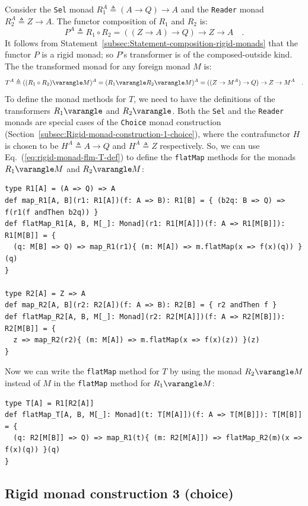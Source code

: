 Consider the \lstinline!Sel! monad $R_{1}^{A}\triangleq\left(A\rightarrow Q\right)\rightarrow A$
and the \lstinline!Reader! monad $R_{2}^{A}\triangleq Z\rightarrow A$.
The functor composition of $R_{1}$ and $R_{2}$ is:
\[
P^{A}\triangleq R_{1}\circ R_{2}=((Z\rightarrow A)\rightarrow Q)\rightarrow Z\rightarrow A\quad.
\]
It follows from Statement~\ref{subsec:Statement-composition-rigid-monads}
that the functor $P$ is a rigid monad; so $P$\textsf{'}s transformer is of
the composed-outside kind. The the transformed monad for any foreign
monad $M$ is:
\[
T^{A}\triangleq((R_{1}\circ R_{2})\varangle M)^{A}=(R_{1}\varangle R_{2}\varangle M)^{A}=((Z\rightarrow M^{A})\rightarrow Q)\rightarrow Z\rightarrow M^{A}\quad.
\]
To define the monad methods for $T$, we need to have the definitions
of the transformers $R_{1}\varangle$ and $R_{2}\varangle$. Both
the \lstinline!Sel! and the \lstinline!Reader! monads are special
cases of the \lstinline!Choice! monad construction (Section~\ref{subsec:Rigid-monad-construction-1-choice}),
where the contrafunctor $H$ is chosen to be $H^{A}\triangleq A\rightarrow Q$
and $H^{A}\triangleq Z$ respectively. So, we can use Eq.~(\ref{eq:rigid-monad-flm-T-def})
to define the \lstinline!flatMap! methods for the monads $R_{1}\varangle M$
and $R_{2}\varangle M$:
\begin{lstlisting}
type R1[A] = (A => Q) => A
def map_R1[A, B](r1: R1[A])(f: A => B): R1[B] = { (b2q: B => Q) => f(r1(f andThen b2q)) }
def flatMap_R1[A, B, M[_]: Monad](r1: R1[M[A]])(f: A => R1[M[B]]): R1[M[B]] = {
  (q: M[B] => Q) => map_R1(r1){ (m: M[A]) => m.flatMap(x => f(x)(q)) }(q)
}

type R2[A] = Z => A
def map_R2[A, B](r2: R2[A])(f: A => B): R2[B] = { r2 andThen f }
def flatMap_R2[A, B, M[_]: Monad](r2: R2[M[A]])(f: A => R2[M[B]]): R2[M[B]] = {
  z => map_R2(r2){ (m: M[A]) => m.flatMap(x => f(x)(z)) }(z)
}   
\end{lstlisting}
Now we can write the \lstinline!flatMap! method for $T$ by using
the monad $R_{2}\varangle M$ instead of $M$ in the \lstinline!flatMap!
method for $R_{1}\varangle M$:
\begin{lstlisting}
type T[A] = R1[R2[A]]
def flatMap_T[A, B, M[_]: Monad](t: T[M[A]])(f: A => T[M[B]]): T[M[B]] = {
  (q: R2[M[B]] => Q) => map_R1(t){ (m: R2[M[A]]) => flatMap_R2(m)(x => f(x)(q)) }(q)
}
\end{lstlisting}


\subsection{Rigid monad construction 3 (choice)\label{subsec:Rigid-monad-construction-1-choice}}

